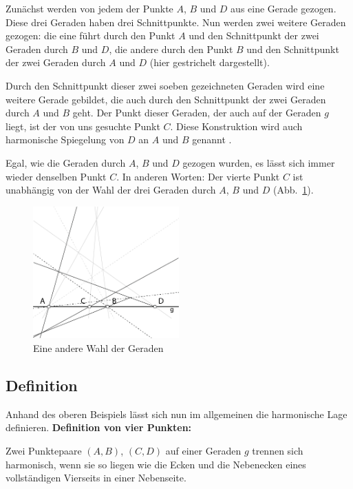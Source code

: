 \documentclass[12pt,a4paper]{article}
\begin{document}
Zunächst werden von jedem der Punkte $A$, $B$ und $D$ aus eine Gerade gezogen. Diese drei Geraden haben drei Schnittpunkte. Nun werden zwei weitere Geraden gezogen: die eine führt durch den Punkt $A$ und den Schnittpunkt der zwei Geraden durch $B$ und $D$, die andere durch den Punkt $B$ und den Schnittpunkt der zwei Geraden durch $A$ und $D$ (hier gestrichelt dargestellt).

Durch den Schnittpunkt dieser zwei soeben gezeichneten Geraden wird eine weitere Gerade gebildet, die auch durch den Schnittpunkt der zwei Geraden durch $A$ und $B$ geht. Der Punkt dieser Geraden, der auch auf der Geraden $g$ liegt, ist der von uns gesuchte Punkt $C$. Diese Konstruktion wird auch harmonische Spiegelung von $D$ an $A$ und $B$ genannt \citep[vgl.~][S.~34]{harmonischeLage}.

Egal, wie die Geraden durch $A$, $B$ und $D$ gezogen wurden, es lässt sich immer wieder denselben Punkt $C$. In anderen Worten: Der vierte Punkt $C$ ist unabhängig von der Wahl der drei Geraden durch $A$, $B$ und $D$ (Abb.~\ref{fig:AndereWahl}).

\begin{figure}[htbp]
\centering
\includegraphics[width=0.5\textwidth]{Bilder/fuer_mehrere_geraden.png}
\caption{Eine andere Wahl der Geraden}
\label{fig:AndereWahl}
\end{figure}

\subsection{Definition}

Anhand des oberen Beispiels lässt sich nun im allgemeinen die harmonische Lage definieren.
\newline
\newline
\textbf{Definition von vier Punkten:}

Zwei Punktepaare $(A,B)$, $(C,D)$ auf einer Geraden $g$ \glqq trennen sich harmonisch\grqq , wenn sie so liegen wie die Ecken und die Nebenecken eines vollständigen Vierseits in einer Nebenseite.
\end{document}
